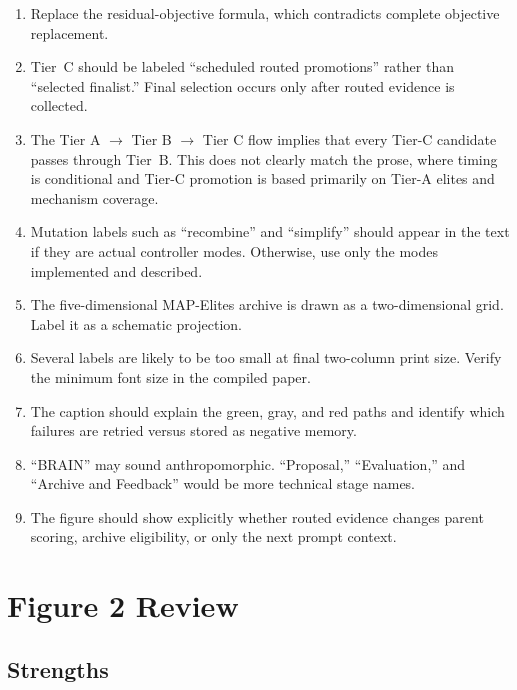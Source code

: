 \documentclass[11pt]{article}
\begin{document}
\begin{enumerate}
  \item Replace the residual-objective formula, which contradicts complete
  objective replacement.

  \item Tier~C should be labeled ``scheduled routed promotions'' rather than
  ``selected finalist.'' Final selection occurs only after routed evidence is
  collected.

  \item The Tier A $\rightarrow$ Tier B $\rightarrow$ Tier C flow implies that
  every Tier-C candidate passes through Tier~B. This does not clearly match the
  prose, where timing is conditional and Tier-C promotion is based primarily
  on Tier-A elites and mechanism coverage.

  \item Mutation labels such as ``recombine'' and ``simplify'' should appear in
  the text if they are actual controller modes. Otherwise, use only the modes
  implemented and described.

  \item The five-dimensional MAP-Elites archive is drawn as a two-dimensional
  grid. Label it as a schematic projection.

  \item Several labels are likely to be too small at final two-column print
  size. Verify the minimum font size in the compiled paper.

  \item The caption should explain the green, gray, and red paths and identify
  which failures are retried versus stored as negative memory.

  \item ``BRAIN'' may sound anthropomorphic. ``Proposal,'' ``Evaluation,'' and
  ``Archive and Feedback'' would be more technical stage names.

  \item The figure should show explicitly whether routed evidence changes
  parent scoring, archive eligibility, or only the next prompt context.
\end{enumerate}

\section{Figure 2 Review}

\subsection{Strengths}
\end{document}

